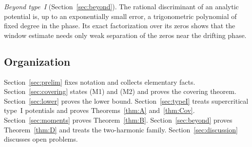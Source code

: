 \emph{Beyond type~I} (Section~\ref{sec:beyond}). The rational discriminant of an analytic potential is, up to an exponentially small error, a trigonometric polynomial of fixed degree in the phase. Its exact factorization over its zeros shows that the window estimate needs only weak separation of the zeros near the drifting phase.

\subsection{Organization}

Section~\ref{sec:prelim} fixes notation and collects elementary facts. Section~\ref{sec:covering} states (M1) and (M2) and proves the covering theorem. Section~\ref{sec:lower} proves the lower bound. Section~\ref{sec:typeI} treats supercritical type~I potentials and proves Theorems~\ref{thm:A} and~\ref{thm:Cov}. Section~\ref{sec:moments} proves Theorem~\ref{thm:B}. Section~\ref{sec:beyond} proves Theorem~\ref{thm:D} and treats the two-harmonic family. Section~\ref{sec:discussion} discusses open problems.
